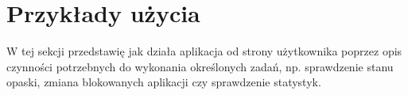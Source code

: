 \section{Przykłady użycia}
W tej sekcji przedstawię jak działa aplikacja od strony użytkownika poprzez opis czynności potrzebnych do wykonania określonych zadań, np. sprawdzenie stanu opaski, zmiana blokowanych aplikacji czy sprawdzenie statystyk.